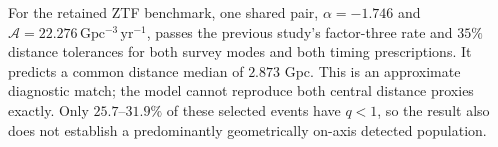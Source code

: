 
For the retained ZTF benchmark, one shared pair, $\alpha=-1.746$ and
$\mathcal A=22.276\,\mathrm{Gpc^{-3}\,yr^{-1}}$, passes the
previous study's factor-three rate and $35\%$ distance tolerances for both
survey modes and both timing prescriptions. It predicts a common distance
median of $2.873$ Gpc. This is an approximate diagnostic match;
the model cannot reproduce both central distance proxies exactly. Only
$25.7$--$31.9\%$ of these selected events have $q<1$, so the result also
does not establish a predominantly geometrically on-axis detected population.

